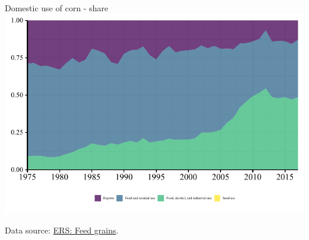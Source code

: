 \documentclass[table,xcolor=pdftex,dvipsnames, handout]{beamer}\usepackage[]{graphicx}\usepackage[]{color}
\makeatletter
\def\maxwidth{ %
  \ifdim\Gin@nat@width>\linewidth
    \linewidth
  \else
    \Gin@nat@width
  \fi
}
\newenvironment{knitrout}{}{} %
\makeatother
\begin{document}

\begin{frame}{Domestic use of corn - share}
\begin{knitrout}
\color{fgcolor}
\includegraphics[width=\maxwidth]{figure/figure_share-1} 

\end{knitrout}
\scriptsize
Data source: \href{https://www.ers.usda.gov/data-products/feed-grains-database/feed-grains-yearbook-tables/}{ERS: Feed grains}.
\end{frame}


\end{document}
